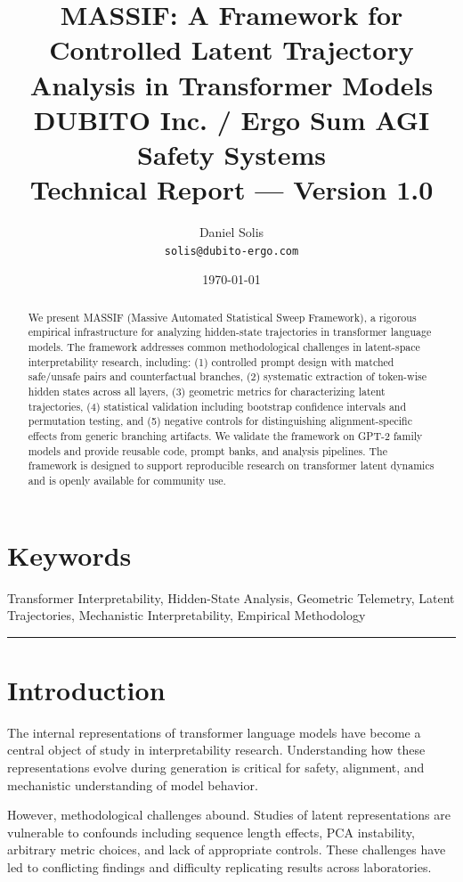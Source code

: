 \documentclass[12pt,a4paper]{article}
\title{\textbf{MASSIF: A Framework for Controlled Latent Trajectory Analysis in Transformer Models}\\
\large DUBITO Inc. / Ergo Sum AGI Safety Systems\\
\small Technical Report --- Version 1.0}
\author{Daniel Solis\\
\small \texttt{solis@dubito-ergo.com}}
\date{\today}
\begin{document}
\maketitle

\begin{abstract}
\noindent
We present MASSIF (Massive Automated Statistical Sweep Framework), a rigorous empirical infrastructure for analyzing hidden-state trajectories in transformer language models. The framework addresses common methodological challenges in latent-space interpretability research, including: (1) controlled prompt design with matched safe/unsafe pairs and counterfactual branches, (2) systematic extraction of token-wise hidden states across all layers, (3) geometric metrics for characterizing latent trajectories, (4) statistical validation including bootstrap confidence intervals and permutation testing, and (5) negative controls for distinguishing alignment-specific effects from generic branching artifacts. We validate the framework on GPT-2 family models and provide reusable code, prompt banks, and analysis pipelines. The framework is designed to support reproducible research on transformer latent dynamics and is openly available for community use.
\end{abstract}

\section*{Keywords}
Transformer Interpretability, Hidden-State Analysis, Geometric Telemetry, Latent Trajectories, Mechanistic Interpretability, Empirical Methodology

\medskip
\hrule
\medskip

\section{Introduction}

The internal representations of transformer language models have become a central object of study in interpretability research. Understanding how these representations evolve during generation is critical for safety, alignment, and mechanistic understanding of model behavior.

However, methodological challenges abound. Studies of latent representations are vulnerable to confounds including sequence length effects, PCA instability, arbitrary metric choices, and lack of appropriate controls. These challenges have led to conflicting findings and difficulty replicating results across laboratories.
\end{document}
